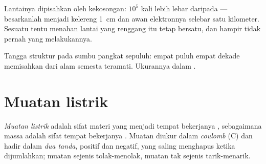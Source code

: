 \begin{remark}\label{rem:g11:fundamental-interactions:empty}
Lantainya dipisahkan oleh kekosongan:  $10^{5}$ kali lebih lebar
daripada  --- besarkanlah  menjadi kelereng
\qty{1}{cm} dan awan elektronnya selebar satu kilometer. Sesuatu tentu
menahan lantai yang renggang itu tetap bersatu, dan hampir tidak pernah
 yang melakukannya.
\end{remark}

\begin{omfigure}

{\small Tangga struktur pada sumbu pangkat sepuluh: empat puluh empat
dekade memisahkan  dari alam semesta teramati. Ukurannya dalam
.}
\end{omfigure}

\section{Muatan listrik}

\begin{definition}\label{def:g11:fundamental-interactions:charge}
\emph{Muatan listrik} adalah sifat materi yang
menjadi tempat bekerjanya , sebagaimana massa
adalah sifat tempat bekerjanya . Muatan diukur dalam
\emph{coulomb} (\unit{C}) dan hadir dalam \emph{dua
tanda}, positif dan negatif, yang saling menghapus ketika dijumlahkan;
muatan sejenis tolak-menolak, muatan tak sejenis tarik-menarik.
\end{definition}

